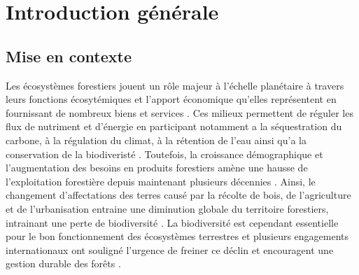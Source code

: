 \chapter*{Introduction générale}         %
\label{chap-introduction}       %


\section*{Mise en contexte}
\label{sec:contexte}

Les écosystèmes forestiers jouent un rôle majeur à l’échelle planétaire à travers leurs fonctions écosytémiques et l'apport économique qu’elles représentent en fournissant de nombreux biens et services \citep{Balvanera2006Quantifyingevidence}. 
Ces milieux permettent de réguler les flux de nutriment et d’énergie en participant notamment a la séquestration du carbone, à la régulation du climat, à la rétention de l’eau ainsi qu’a la conservation de la biodiveristé \citep{Balvanera2006Quantifyingevidence,Diaz2006BiodiversityLoss,Canadell2008Managingforests,Pawson2013Plantationforests}. 
Toutefois, la croissance démographique et l’augmentation des besoins en produits forestiers amène une hausse de l’exploitation forestière depuis maintenant plusieurs décennies \citep{Foley2005GlobalConsequences}. 
Ainsi, le changement d’affectations des terres causé par la récolte de bois, de l’agriculture et de l’urbanisation entraine une diminution globale du territoire forestiers, intrainant une perte de biodiversité \citep{Bengtsson2000Biodiversitydisturbances,Sala2000Globalbiodiversity,Naeem2012functionsbiological,Bichet2016Maintaininganimal}. 
La biodiversité est cependant essentielle pour le bon fonctionnement des écosystèmes terrestres et plusieurs engagements internationaux ont souligné l'urgence de freiner ce déclin et encouragent une gestion durable des forêts \citep{Newbold2015Globaleffects}. 

